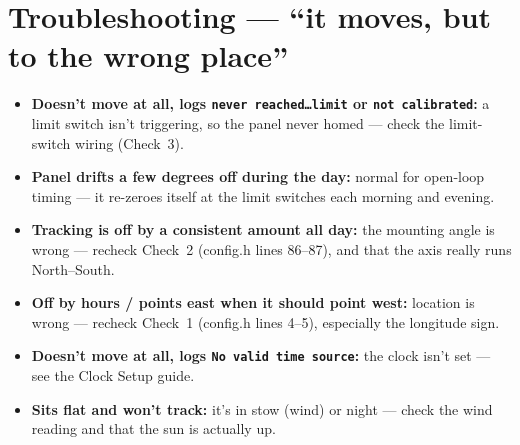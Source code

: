 \documentclass[11pt]{article}
\begin{document}
\section{Troubleshooting --- ``it moves, but to the wrong place''}
\begin{itemize}[leftmargin=1.6em]
  \item \textbf{Doesn't move at all, logs \texttt{never reached\ldots limit} or
        \texttt{not calibrated}:} a limit switch isn't triggering, so the panel never
        homed --- check the limit-switch wiring (Check~3).
  \item \textbf{Panel drifts a few degrees off during the day:} normal for open-loop
        timing --- it re-zeroes itself at the limit switches each morning and evening.
  \item \textbf{Tracking is off by a consistent amount all day:} the mounting angle
        is wrong --- recheck Check~2 (config.h lines 86--87), and that the axis really
        runs North--South.
  \item \textbf{Off by hours / points east when it should point west:} location is
        wrong --- recheck Check~1 (config.h lines 4--5), especially the longitude sign.
  \item \textbf{Doesn't move at all, logs \texttt{No valid time source}:} the clock
        isn't set --- see the Clock Setup guide.
  \item \textbf{Sits flat and won't track:} it's in stow (wind) or night --- check the
        wind reading and that the sun is actually up.
\end{itemize}
\end{document}
